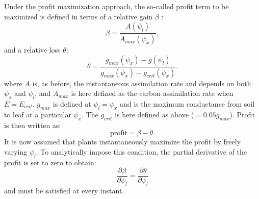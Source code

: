 \documentclass[utf8]{frontiersSCNS} %
\begin{document}
Under the profit maximization approach, the so-called profit term to be maximized is defined in terms of a relative gain $\beta$ \citep{sperry_predicting_2017}:
\begin{equation}
    \beta = \frac{A(\psi_l)}{A_{max}(\psi_x)},
    \label{eqn:rel_gain}
\end{equation}
and a relative loss $\theta$:
\begin{equation}
    \theta = \frac{g_{max}(\psi_x) - g(\psi_l)}{g_{max}(\psi_x) - g_{crit}(\psi_x)}.
    \label{eqn:rel_loss}
\end{equation}
where $A$ is, as before, the instantaneous assimilation rate and depends on both $\psi_x$ and $\psi_l$, and $A_{max}$ is here defined as the carbon assimilation rate when $E = E_{crit}$. $g_{max}$ is defined at $\psi_l = \psi_x$ and is the maximum conductance from soil to leaf at a particular $\psi_x$. The $g_{crit}$ is here defined as above ($= 0.05 g_{max}$). Profit is then written as:
\begin{equation}
    \text{profit} = \beta - \theta.
    \label{eqn:profit}
\end{equation}
It is now assumed that plants instantaneously maximize the profit by freely varying $\psi_l$. To analytically impose this condition, the partial derivative of the profit is set to zero to obtain:
\begin{equation}
    \frac{\partial \beta}{\partial \psi_l} = \frac{\partial \theta}{\partial \psi_l}
\end{equation}
and must be satisfied at every instant.
\end{document}
